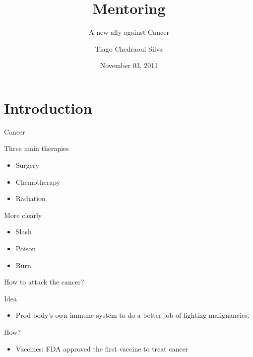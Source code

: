 \documentclass[dvips,11pt,xcolor=dvipsnames]{beamer}
\title{Mentoring}
\subtitle{A new ally against Cancer}
\author[Tiago S.]{
  Tiago Chedraoui Silva \\
}
\institute{}
\date{November 03, 2011}
\numberwithin{table}{section}
\numberwithin{figure}{section} %
\begin{document}
\begin{frame}
  \titlepage
\end{frame}



\section{Introduction}

\begin{frame}{Cancer}
 
 \begin{block}{Three main therapies}
    \begin{itemize}
    \item Surgery 
    \item Chemotherapy 
    \item Radiation 
    \end{itemize}
  \end{block}

\pause \begin{alertblock}{More clearly}
    \begin{itemize}
    \item Slash 
    \item Poison 
    \item Burn 
    \end{itemize}
  \end{alertblock}

\end{frame}




\begin{frame}{How to attack the cancer?}
 \begin{block}{Idea}
    \begin{itemize}
    \item Prod body's own immune system to do a better job of fighting malignancies.
    \end{itemize}
  \end{block}

\pause \begin{block}{How?}
    \begin{itemize}
    \item Vaccines: FDA approved the first vaccine to treat cancer
    \end{itemize}
  \end{block}
\end{frame}
\end{document}
